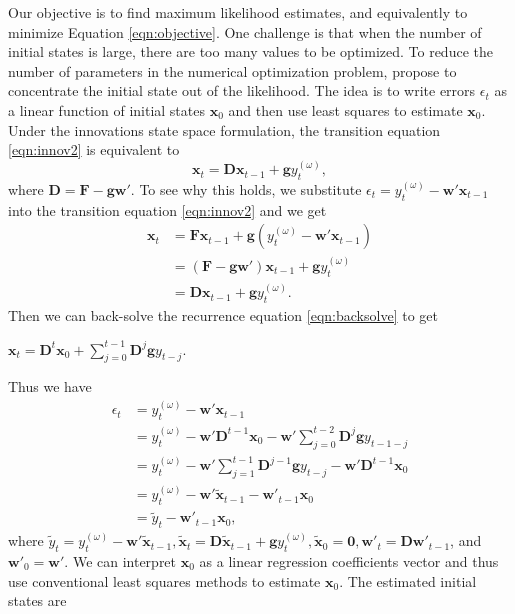 \documentclass{uwstat572}
\begin{document}
Our objective is to find maximum likelihood estimates, and equivalently to minimize Equation \ref{eqn:objective}. One challenge is that when the number of initial states is large, there are too many values to be optimized. To reduce the number of parameters in the numerical optimization problem, \citet{de2011forecasting} propose to concentrate the initial state out of the likelihood. The idea is to write errors $\epsilon_t$ as a linear function of initial states $\textbf{x}_0$ and then use least squares to estimate $\textbf{x}_0$. Under the innovations state space formulation, the transition equation \ref{eqn:innov2} is equivalent to 
\begin{equation}
\textbf{x}_t=\textbf{D}\textbf{x}_{t-1}+\textbf{g}y_t^{(\omega)}, \label{eqn:backsolve}
\end{equation}
where $\textbf{D}=\textbf{F}-\textbf{g} \textbf{w}'$. To see why this holds, we substitute $\displaystyle  \epsilon_t=y_t^{(\omega)}-\textbf{w}'\textbf{x}_{t-1}$ into the transition equation \ref{eqn:innov2} and we get
\begin{align*}
\textbf{x}_t&= \textbf{F}\textbf{x}_{t-1}+\textbf{g}(y_t^{(\omega)}-\textbf{w}'\textbf{x}_{t-1}) \\
&= (\textbf{F}-\textbf{g} \textbf{w}') \textbf{x}_{t-1} +\textbf{g} y_t^{(\omega)} \\
&= \textbf{D} \textbf{x}_{t-1} +\textbf{g}y_t^{(\omega)}  .
\end{align*}
Then we can back-solve the recurrence equation \ref{eqn:backsolve} to get 
\begin{center}
$\textbf{x}_t=\textbf{D}^t \textbf{x}_0+\sum\limits_{j=0}^{t-1} \textbf{D}^j \textbf{g} y_{t-j}$.
\end{center}
Thus we have 
\begin{align*}
\epsilon_t &= y_t^{(\omega)}-\textbf{w}'\textbf{x}_{t-1} \\
&= y_t^{(\omega)}-\textbf{w}'\textbf{D}^{t-1} \textbf{x}_0-\textbf{w}' \sum\limits_{j=0}^{t-2} \textbf{D}^j \textbf{g} y_{t-1-j} \\
&=  y_t^{(\omega)}-\textbf{w}' \sum\limits_{j=1}^{t-1} \textbf{D}^{j -1}\textbf{g} y_{t-j} -\textbf{w}' \textbf{D}^{t-1} \textbf{x}_0\\
&=  y_t^{(\omega)}- \textbf{w}' \tilde{\textbf{x}}_{t-1}-\textbf{w}'_{t-1}\textbf{x}_0 \\
&= \tilde{y}_t -\textbf{w}'_{t-1}\textbf{x}_0,
\end{align*}
where $ \tilde{y}_t=y_t^{(\omega)}- \textbf{w}' \tilde{\textbf{x}}_{t-1}, \tilde{\textbf{x}}_t=\textbf{D}\tilde{\textbf{x}}_{t-1}+\textbf{g}y_t^{(\omega)}, \tilde{\textbf{x}}_0=\textbf{0}, \textbf{w}'_{t}=\textbf{D}\textbf{w}'_{t-1}$, and $\textbf{w}'_{0}=\textbf{w}'$. We can interpret $\textbf{x}_0$ as a linear regression coefficients vector and thus use conventional least squares methods to estimate $\textbf{x}_0$. The estimated initial states are 
\end{document}
